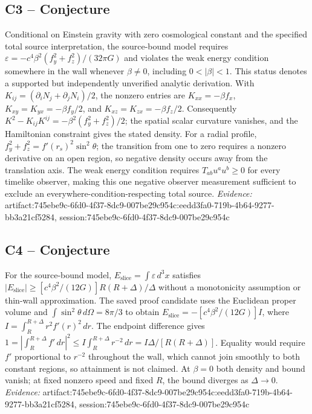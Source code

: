 \documentclass[11pt]{article}
\begin{document}
\subsection{C3 -- Conjecture}
Conditional on Einstein gravity with zero cosmological constant and the specified total source interpretation, the source-bound model requires $\varepsilon=-c^4\beta^2(f_y^2+f_z^2)/(32\pi G)$ and violates the weak energy condition somewhere in the wall whenever $\beta\neq0$, including $0<|\beta|<1$.
This status denotes a supported but independently unverified analytic derivation. With $K_{ij}=(\partial_iN_j+\partial_jN_i)/2$, the nonzero entries are $K_{xx}=-\beta f_x$, $K_{xy}=K_{yx}=-\beta f_y/2$, and $K_{xz}=K_{zx}=-\beta f_z/2$. Consequently $K^2-K_{ij}K^{ij}=-\beta^2(f_y^2+f_z^2)/2$; the spatial scalar curvature vanishes, and the Hamiltonian constraint gives the stated density. For a radial profile, $f_y^2+f_z^2=f'(r_s)^2\sin^2\theta$; the transition from one to zero requires a nonzero derivative on an open region, so negative density occurs away from the translation axis. The weak energy condition requires $T_{ab}u^au^b\geq0$ for every timelike observer, making this one negative observer measurement sufficient to exclude an everywhere-condition-respecting total source.
\textit{Evidence: }artifact:745ebe9c-6fd0-4f37-8dc9-007be29c954c:eedd3fa0-719b-4b64-9277-bb3a21cf5284, session:745ebe9c-6fd0-4f37-8dc9-007be29c954c
\subsection{C4 -- Conjecture}
For the source-bound model, $E_{\mathrm{slice}}=\int\varepsilon\,d^3x$ satisfies $|E_{\mathrm{slice}}|\geq[c^4\beta^2/(12G)]R(R+\Delta)/\Delta$ without a monotonicity assumption or thin-wall approximation.
The saved proof candidate uses the Euclidean proper volume and $\int\sin^2\theta\,d\Omega=8\pi/3$ to obtain $E_{\mathrm{slice}}=-[c^4\beta^2/(12G)]I$, where $I=\int_R^{R+\Delta}r^2f'(r)^2\,dr$. The endpoint difference gives $1=|\int_R^{R+\Delta}f'\,dr|^2\leq I\int_R^{R+\Delta}r^{-2}\,dr=I\Delta/[R(R+\Delta)]$. Equality would require $f'$ proportional to $r^{-2}$ throughout the wall, which cannot join smoothly to both constant regions, so attainment is not claimed. At $\beta=0$ both density and bound vanish; at fixed nonzero speed and fixed $R$, the bound diverges as $\Delta\to0$.
\textit{Evidence: }artifact:745ebe9c-6fd0-4f37-8dc9-007be29c954c:eedd3fa0-719b-4b64-9277-bb3a21cf5284, session:745ebe9c-6fd0-4f37-8dc9-007be29c954c
\end{document}
